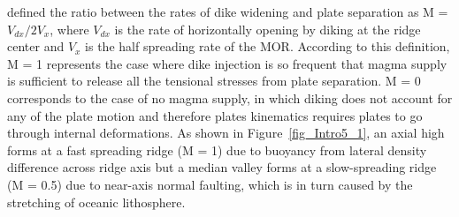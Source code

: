 
\citet{Buck2005} %
defined the ratio between the rates of dike widening and plate separation as M = $V_{dx}/2V_{x}$, where $V_{dx}$ is the rate of horizontally opening by diking at the ridge center and $V_{x}$ is the half spreading rate of the MOR. According to this definition, M = 1 represents the case where dike injection is so frequent that magma supply is sufficient to release all the tensional stresses from plate separation. M = 0 corresponds to the case of no magma supply, in which diking does not account for any of the plate motion and therefore plates kinematics requires plates to go through internal deformations. As shown in Figure~\ref{fig_Intro5_1}, an axial high forms at a fast spreading ridge (M = 1) due to buoyancy from lateral density difference across ridge axis but a median valley forms at a slow-spreading ridge (M = 0.5) due to near-axis normal faulting, which is in turn caused by the stretching of oceanic lithosphere.


